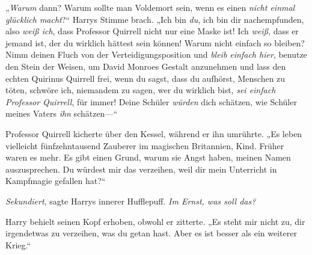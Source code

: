 „\emph{Warum} dann? Warum sollte man Voldemort sein, wenn es einen \emph{nicht einmal glücklich macht}?“
Harrys Stimme brach.
„Ich bin \emph{du}, ich bin dir nachempfunden, also \emph{weiß ich}, dass Professor Quirrell nicht nur eine Maske ist! Ich \emph{weiß}, dass er jemand ist, der du wirklich hättest sein können! Warum nicht einfach so bleiben? Nimm deinen Fluch von der Verteidigungsposition und \emph{bleib einfach hier}, benutze den Stein der Weisen, um David Monroes Gestalt anzunehmen und lass den echten Quirinus Quirrell frei, wenn du sagst, dass du aufhörst, Menschen zu töten, schwöre ich, niemandem zu sagen, wer du wirklich bist, \emph{sei einfach Professor Quirrell}, für immer! Deine Schüler \emph{würden} dich schätzen, wie Schüler meines Vaters \emph{ihn} schätzen—“

Professor Quirrell kicherte über den Kessel, während er ihn umrührte.
„Es leben vielleicht fünfzehntausend Zauberer im magischen Britannien, Kind. Früher waren es mehr. Es gibt einen Grund, warum sie Angst haben, meinen Namen auszusprechen. Du würdest mir das verzeihen, weil dir mein Unterricht in Kampfmagie gefallen hat?“

\emph{Sekundiert}, sagte Harrys innerer Hufflepuff. \emph{Im Ernst, was soll das?}

Harry behielt seinen Kopf erhoben, obwohl er zitterte.
„Es steht mir nicht zu, dir irgendetwas zu verzeihen, was du getan hast. Aber es ist besser als ein weiterer Krieg.“

